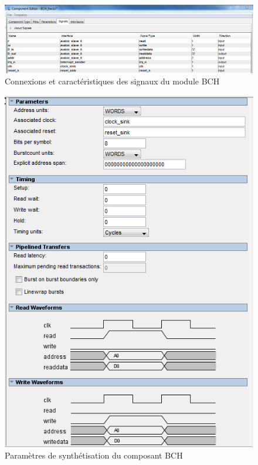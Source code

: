 \documentclass[a4paper, 11pt, svgnames]{report}
\begin{document}
        \begin{figure}[H]
            \centering
            \includegraphics[width=\textwidth]{./images/BCH_hw_signals}
            \caption{Connexions et caractéristiques des signaux du module BCH}
            \label{fig:BCH_hw_signals}
        \end{figure}
        
        \begin{figure}[H]
            \centering
            \includegraphics[width=\textwidth]{./images/BCH_0_parameters}
            \caption{Paramètres de synthétisation du composant BCH}
            \label{fig:BCH_0_parameters}
        \end{figure}
\end{document}
